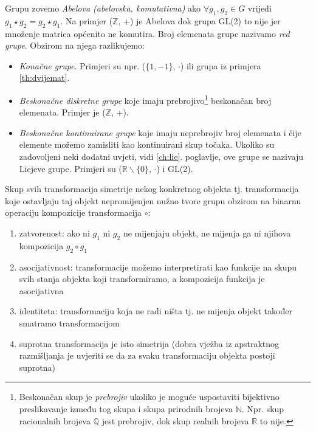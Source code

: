 Grupu zovemo \emph{Abelova (abelovska, komutativna)} ako 
$\forall g_1, g_2 \in G$ vrijedi $g_1 \star g_2 = g_2 \star g_1$.
Na primjer ($\mathbb{Z}$, +) je Abelova dok grupa GL(2) to nije jer množenje
matrica općenito ne komutira.
Broj elemenata grupe nazivamo \emph{red grupe}. 
Obzirom na njega razlikujemo:
\begin{itemize}
\item \emph{Konačne grupe}. Primjeri su npr. ($\{1,-1\}$, $\cdot$) ili
    grupa iz primjera \ref{th:dvijemat}.
\item \emph{Beskonačne diskretne grupe} koje imaju 
    prebrojivo\footnote{Beskonačan skup je \emph{prebrojiv}  ukoliko je moguće uspostaviti
bijektivno preslikavanje između tog skupa i skupa prirodnih brojeva $\mathbb{N}$. Npr. skup
racionalnih brojeva $\mathbb{Q}$ jest prebrojiv, dok skup realnih brojeva
$\mathbb{R}$ to nije.}
beskonačan broj elemenata. Primjer je ($\mathbb{Z}$, +).
\item \emph{Beskonačne kontinuirane grupe} 
koje imaju neprebrojiv broj elemenata i čije elemente možemo
zamisliti kao kontinuirani skup točaka. Ukoliko su zadovoljeni neki dodatni
uvjeti, vidi \ref{ch:lie}. poglavlje, ove grupe se nazivaju Liejeve grupe.
Primjeri su ($\mathbb{R}\backslash\{0\}$, $\cdot$) i GL(2).
\end{itemize}

\begin{primjer} 
Skup svih transformacija simetrije nekog konkretnog objekta tj. transformacija koje ostavljaju
taj objekt nepromijenjen nužno tvore grupu obzirom na binarnu
operaciju kompozicije transformacija $\circ$:
\begin{enumerate}
\item zatvorenost: ako ni $g_1$ ni $g_2$ ne mijenjaju objekt, ne mijenja
    ga ni njihova kompozicija $g_2 \circ g_1$ 
\item asocijativnost: transformacije možemo interpretirati kao 
    funkcije na skupu svih stanja objekta koji transformiramo, a kompozicija funkcija je asocijativna
\item identiteta: transformaciju koja ne radi ništa tj. ne mijenja objekt
      također smatramo transformacijom 
\item suprotna transformacija je isto simetrija (dobra vježba iz apstraktnog 
    razmišljanja je uvjeriti se da za svaku transformaciju objekta postoji suprotna)
\end{enumerate}
\end{primjer}

